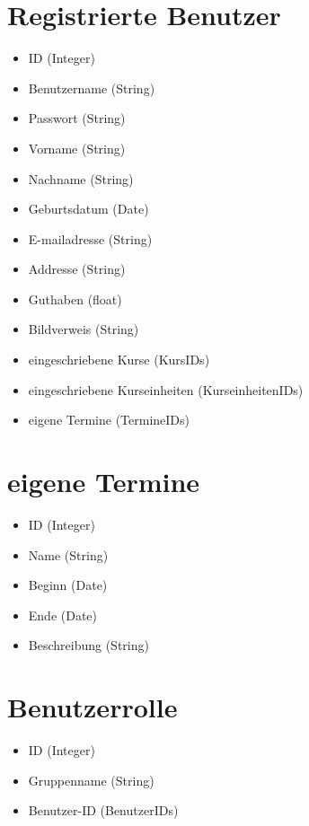 \documentclass[a4paper]{scrreprt}
\newcounter{Lc}
\newcounter{Hc}
\newcommand{\stepHc}{\stepcounter{Hc}\setcounter{Lc}{0}}
\begin{document}
    \section{Registrierte Benutzer}
		  \Func {} 
		  \begin{itemize}
		  	\item ID (Integer)
		  	\item Benutzername (String)
		  	\item Passwort (String)
		  	\item Vorname (String)
		  	\item Nachname (String)
		  	\item Geburtsdatum (Date)
		  	\item E-mailadresse (String)
		  	\item Addresse (String)
		  	\item Guthaben (float)
		  	\item Bildverweis (String)
		  	\item eingeschriebene Kurse (KursIDs)
		  	\item eingeschriebene Kurseinheiten (KurseinheitenIDs)
		  	\item eigene Termine (TermineIDs)
		  \end{itemize}

\stepHc		    
	  \section{eigene Termine}
	    \Func {} 
	    \begin{itemize}
	    	\item ID (Integer)
	    	\item Name (String)
	    	\item Beginn (Date)
	    	\item Ende (Date)
	    	\item Beschreibung (String)
	    \end{itemize}
	   
\stepHc	 
	  \section{Benutzerrolle}
	    \Func {} 
	    \begin{itemize}
	    	\item ID (Integer)
	    	\item Gruppenname (String)
	    	\item Benutzer-ID (BenutzerIDs)
	    \end{itemize}
	    
\end{document}
